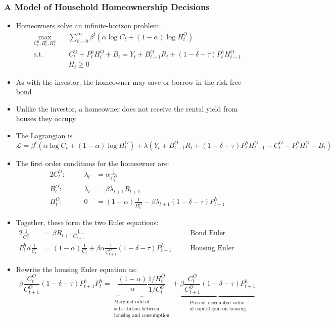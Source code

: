 \documentclass[a4paper,twoside]{article}
\numberwithin{equation}{section}
\numberwithin{figure}{section}
\begin{document}
\subsubsection{A Model of Household Homeownership Decisions}
	\begin{itemize}
		\item Homeowners solve an infinite-horizon problem:
		\begin{align*}
			\max_{C_t^0,B_t^0,H_t^0}\quad &\sum_{t=0}^{\infty} \beta^t (\alpha\log C_t+(1-\alpha)\log H_t^O) \\
			\text{s.t.}\quad &C_t^O + P_t^h H_t^O + B_t = Y_t + B_{t-1}^O R_t + (1-\delta-\tau)P_t^h H_{t-1}^O\\
			& H_t \geq 0
		\end{align*}
		\item As with the investor, the homeowner may \textcolor{myblue}{save} or \textcolor{myblue}{borrow} in the risk free bond
		\item Unlike the investor, a homeowner does not receive the rental yield from houses they occupy
		\item The Lagrangian is
		\[
			\mathcal{L} = \beta^t (\alpha\log C_t+(1-\alpha)\log H_t^O) + \lambda(Y_t + B_{t-1}^O R_t + (1-\delta-\tau)P_t^h H_{t-1}^O - C_t^O - P_t^h H_t^O - B_t)
		\]
		\item The first order conditions for the homeowner are:
		\begin{alignat*}{2}
			C_t^O:\quad && \lambda_t&= \alpha\frac{1}{C_t^O}\\
			B_t^O:\quad && \lambda_t&= \beta\lambda_{t+1}R_{t+1}\\
			H_t^O:\quad && 0&= (1-\alpha)\frac{1}{H_t^O}-\beta\lambda_{t+1}(1-\delta-\tau)P_{t+1}^h
		\end{alignat*}
		\item Together, these form the two Euler equations:
		\begin{alignat*}{2}
			\frac{1}{C_t^O} &= \beta R_{t+1} \frac{1}{C_{t+1}} &&\text{Bond Euler Equation}\\
			P_t^h \alpha\frac{1}{C_t} &= (1-\alpha)\frac{1}{C_t} + \beta\alpha\frac{1}{C_{t+1}^O} (1-\delta-\tau)P_{t+1}^h \quad &&\text{Housing Euler Equation}
		\end{alignat*}
		\item Rewrite the housing Euler equation as:
		\[\beta\frac{C_t^O}{C_{t+1}^O}(1-\delta-\tau)P_{t+1}^h
			P_t^h = \underbrace{\frac{(1-\alpha)}{\alpha}\frac{1/H_t^O}{1/C_t^O}}_{\substack{\text{Marginal rate of}\\\text{substitution between}\\\text{housing and consumption}}} + \underbrace{\beta\frac{C_t^O}{C_{t+1}^O} (1-\delta-\tau)P_{t+1}^h}_{\substack{\text{Present discounted value}\\\text{of capital gain on housing}}}
\]
\end{itemize}
\end{document}
